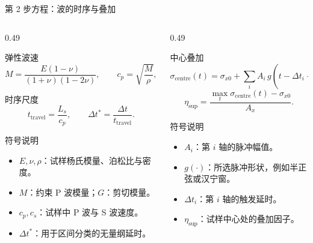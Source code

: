 \documentclass[11pt,aspectratio=169]{beamer}
\begin{document}
\begin{frame}{第 2 步方程：波的时序与叠加}
  \scriptsize
  \begin{columns}[T,onlytextwidth]
    \begin{column}{0.49\textwidth}
      \begin{block}{弹性波速}
        \[
          M=\frac{E(1-\nu)}{(1+\nu)(1-2\nu)},\qquad
          c_p=\sqrt{\frac{M}{\rho}},\qquad
          c_s=\sqrt{\frac{G}{\rho}} .
        \]
      \end{block}
      \begin{block}{时序尺度}
        \[
          t_{\mathrm{travel}}=\frac{L_s}{c_p},\qquad
          \Delta t^\ast=\frac{\Delta t}{t_{\mathrm{travel}}}.
        \]
      \end{block}
      \begin{block}{符号说明}
        \begin{itemize}
          \item $E,\nu,\rho$：试样杨氏模量、泊松比与密度。
          \item $M$：约束 P 波模量；$G$：剪切模量。
          \item $c_p,c_s$：试样中 P 波与 S 波速度。
          \item $\Delta t^\ast$：用于区间分类的无量纲延时。
        \end{itemize}
      \end{block}
    \end{column}
    \begin{column}{0.49\textwidth}
      \begin{exampleblock}{中心叠加}
        \[
          \sigma_{\mathrm{centre}}(t)
          =\sigma_{x0}+
          \sum_i A_i\,g\!\left(t-\Delta t_i-\frac{L_s}{2c_p}\right).
        \]
        \[
          \eta_{\mathrm{sup}}=
          \frac{\max_t\sigma_{\mathrm{centre}}(t)-\sigma_{x0}}{A_x}.
        \]
      \end{exampleblock}
      \begin{block}{符号说明}
        \begin{itemize}
          \item $A_i$：第 $i$ 轴的脉冲幅值。
          \item $g(\cdot)$：所选脉冲形状，例如半正弦或汉宁窗。
          \item $\Delta t_i$：第 $i$ 轴的触发延时。
          \item $\eta_{\mathrm{sup}}$：试样中心处的叠加因子。
        \end{itemize}
      \end{block}
    \end{column}
  \end{columns}
\end{frame}
\end{document}
